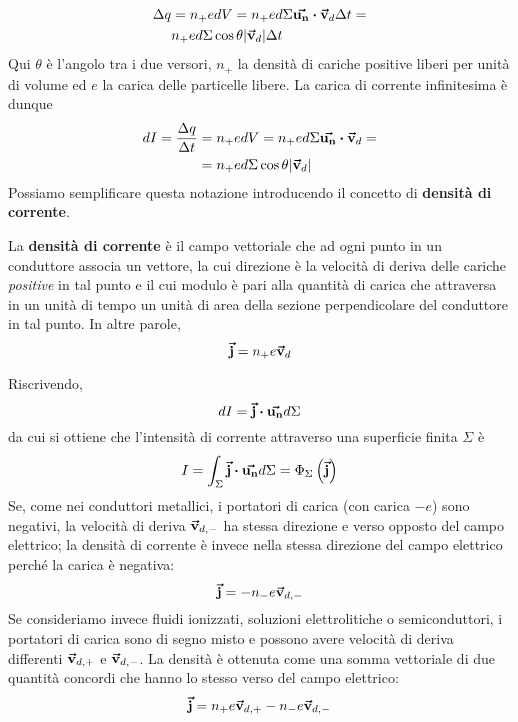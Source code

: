 \begin{align*}
	\Delta q&=n_{+}edV=n_{+}e d\Sigma\vba{u_n}\vdot\vba{v}_d \Delta t=\\
	&n_{+}e  d\Sigma\cos\theta\abs{\vba{v}_d}\Delta t
\end{align*}
Qui $\theta$ è l'angolo tra i due versori, $n_{+}$ la densità di cariche positive liberi per unità di volume ed $e$ la carica delle particelle libere. La carica di corrente infinitesima è dunque
\begin{align*}
	dI=\frac{\Delta q}{\Delta t}&=n_{+}edV=n_{+}e d\Sigma\vba{u_n}\vdot\vba{v}_d=\\
	&=n_{+}e  d\Sigma\cos\theta\abs{\vba{v}_d}
\end{align*}
Possiamo semplificare questa notazione introducendo il concetto di \textbf{densità di corrente}. 
\begin{define}
	La \textbf{densità di corrente} è il campo vettoriale che ad ogni punto in un conduttore associa un vettore, la cui direzione è la velocità di deriva delle cariche \textit{positive} in tal punto e il cui modulo è pari alla quantità di carica che attraversa in un unità di tempo un unità di area della sezione perpendicolare del conduttore in tal punto. In altre parole,
	\begin{equation}
		\vb*{\va{j}}=n_{+}e\vb*{\va{v}}_d
	\end{equation}
\end{define}
Riscrivendo,
\begin{equation*}
	dI=\vba{j}\vdot \vba{u_n}d\Sigma
\end{equation*}
da cui si ottiene che l'intensità di corrente attraverso una superficie finita $\Sigma$ è
\begin{equation}
	I=\int_{\Sigma}\vba{j}\vdot \vba{u_n}d\Sigma=\Phi_{\Sigma}\left(\vba{j}\right)
\end{equation}
Se, come nei conduttori metallici, i portatori di carica (con carica $-e$) sono negativi, la velocità di deriva $\vb*{\va{v}}_{d,-}$ ha stessa direzione e verso opposto del campo elettrico; la densità di corrente è invece nella stessa direzione del campo elettrico perché la carica è negativa:
\begin{equation}
	\vb*{\va{j}}=-n_{-}e\vb*{\va{v}}_{d,-}
\end{equation}
Se consideriamo invece fluidi ionizzati, soluzioni elettrolitiche o semiconduttori, i portatori di carica sono di segno misto e possono avere velocità di deriva differenti $\vb*{\va{v}}_{d,+}$ e $\vb*{\va{v}}_{d,-}$. La densità è ottenuta come una somma vettoriale di due quantità concordi che hanno lo stesso verso del campo elettrico:
\begin{equation}
	\vb*{\va{j}}=n_{+}e\vb*{\va{v}}_{d,+}-n_{-}e\vb*{\va{v}}_{d,-}
\end{equation}
